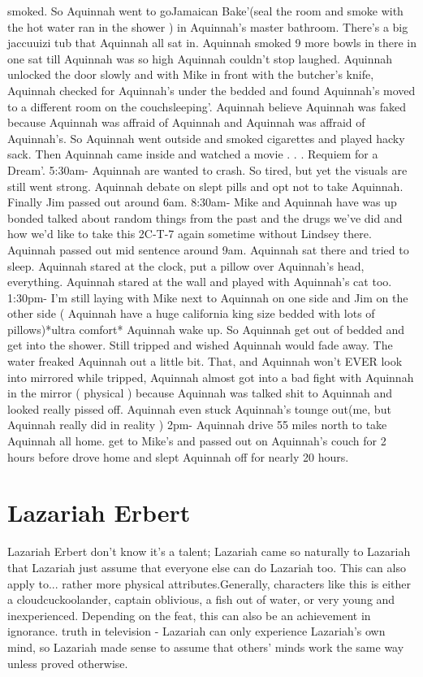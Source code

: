 \documentclass[12pt]{book}
\begin{document}
smoked. So Aquinnah went to goJamaican Bake'(seal the room and smoke with the hot water ran in the shower ) in Aquinnah's master bathroom. There's a big jaccuuizi tub that Aquinnah all sat in. Aquinnah smoked 9 more bowls in there in one sat till Aquinnah was so high Aquinnah couldn't stop laughed. Aquinnah unlocked the door slowly and with Mike in front with the butcher's knife, Aquinnah checked for Aquinnah's under the bedded and found Aquinnah's moved to a different room on the couchsleeping'. Aquinnah believe Aquinnah was faked because Aquinnah was affraid of Aquinnah and Aquinnah was affraid of Aquinnah's. So Aquinnah went outside and smoked cigarettes and played hacky sack. Then Aquinnah came inside and watched a movie . . . Requiem for a Dream'. 5:30am- Aquinnah are wanted to crash. So tired, but yet the visuals are still went strong. Aquinnah debate on slept pills and opt not to take Aquinnah. Finally Jim passed out around 6am. 8:30am- Mike and Aquinnah have was up bonded talked about random things from the past and the drugs we've did and how we'd like to take this 2C-T-7 again sometime without Lindsey there. Aquinnah passed out mid sentence around 9am. Aquinnah sat there and tried to sleep. Aquinnah stared at the clock, put a pillow over Aquinnah's head, everything. Aquinnah stared at the wall and played with Aquinnah's cat too. 1:30pm- I'm still laying with Mike next to Aquinnah on one side and Jim on the other side ( Aquinnah have a huge california king size bedded with lots of pillows)*ultra comfort* Aquinnah wake up. So Aquinnah get out of bedded and get into the shower. Still tripped and wished Aquinnah would fade away. The water freaked Aquinnah out a little bit. That, and Aquinnah won't EVER look into mirrored while tripped, Aquinnah almost got into a bad fight with Aquinnah in the mirror ( physical ) because Aquinnah was talked shit to Aquinnah and looked really pissed off. Aquinnah even stuck Aquinnah's tounge out(me, but Aquinnah really did in reality ) 2pm- Aquinnah drive 55 miles north to take Aquinnah all home. get to Mike's and passed out on Aquinnah's couch for 2 hours before drove home and slept Aquinnah off for nearly 20 hours.






\chapter{Lazariah Erbert}

Lazariah Erbert don't know it's a talent; Lazariah came so naturally to Lazariah that Lazariah just assume that everyone else can do Lazariah too. This can also apply to... rather more physical attributes.Generally, characters like this is either a cloudcuckoolander, captain oblivious, a fish out of water, or very young and inexperienced. Depending on the feat, this can also be an achievement in ignorance. truth in television - Lazariah can only experience Lazariah's own mind, so Lazariah made sense to assume that others' minds work the same way unless proved otherwise.
\end{document}
